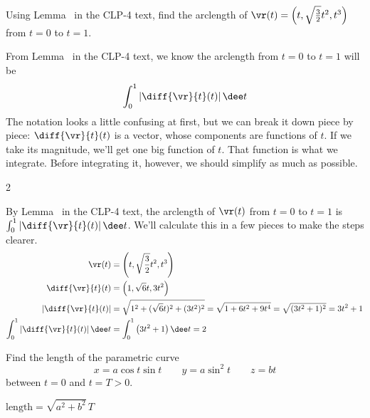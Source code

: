 \begin{question}\label{prob_s1.1:lemma113}
Using Lemma~  in the CLP-4 text, 
find the arclength of $\vr(t)=\left(t,\sqrt{\frac{3}{2}}t^2,t^3\right)$ 
from $t=0$ to $t=1$.
\end{question}
\begin{hint}
From Lemma~ in the CLP-4 text, we know 
the arclength from $t=0$ to $t=1$ will be
\[\int_{0}^1\left| \diff{\vr}{t}(t)\right|\dee t\]
The notation looks a little confusing at first, but we can break it down piece by piece: $\diff{\vr}{t}(t)$ is a vector, whose components are functions of $t$. If we take its magnitude, we'll get one big function of $t$. That function is what we integrate. Before integrating it, however, we should simplify as much as possible.
\end{hint}
\begin{answer}
2
\end{answer}
\begin{solution}
By Lemma~  in the CLP-4 text,  
the arclength of $\vr(t)$ from $t=0$ to $t=1$ is
$\int_{0}^1\left| \diff{\vr}{t}(t)\right|\dee t$. We'll calculate this in a few pieces to make the steps clearer.
\begin{align*}
\vr(t)&=\left(t,\sqrt{\frac{3}{2}}t^2,t^3\right)\\
\diff{\vr}{t}(t)&=\left(1,\sqrt{6}t,3t^2\right)\\
\left|\diff{\vr}{t}(t)\right|&=\sqrt{1^2+(\sqrt{6}t)^2+(3t^2)^2}=\sqrt{1+6t^2+9t^4}=\sqrt{(3t^2+1)^2}=3t^2+1\\
\int_{0}^1\left| \diff{\vr}{t}(t)\right|\dee t&=\int_0^1\left(3t^2+1 \right)\dee t=2
\end{align*}
\end{solution}


\begin{question}
Find the length of the parametric curve
\begin{equation*}
x=a\cos t\sin t\qquad
y=a\sin^2 t\qquad
z=bt
\end{equation*}
between $t=0$ and $t=T>0$.
\end{question}

%

\begin{answer} 
$\text{length}=\sqrt{a^2+b^2}\,T$
\end{answer}

